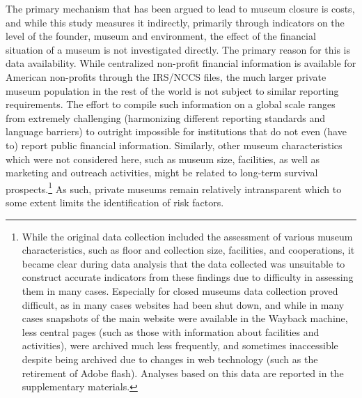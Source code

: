 \documentclass[12pt]{article}
\begin{document}
The primary mechanism that has been argued to lead to museum closure is costs, and while this study measures it indirectly, primarily through indicators on the level of the founder, museum and environment, the effect of the financial situation of a museum is not investigated directly.
The primary reason for this is data availability.
While centralized non-profit financial information is available for American non-profits through the IRS/NCCS files, the much larger private museum population in the rest of the world is not subject to similar reporting requirements.
The effort to compile such information on a global scale ranges from extremely challenging (harmonizing different reporting standards and language barriers) to outright impossible for institutions that do not even (have to) report public financial information.
Similarly, other museum characteristics which were not considered here, such as museum size, facilities, as well as marketing and outreach activities, might be related to long-term survival prospects.\footnote{While the original data collection included the assessment of various museum characteristics, such as floor and collection size, facilities, and cooperations, it became clear during data analysis that the data collected was unsuitable to construct accurate indicators from these findings due to difficulty in assessing them in many cases. Especially for closed museums data collection proved difficult, as in many cases websites had been shut down, and while in many cases snapshots of the main website were available in the Wayback machine, less central pages (such as those with information about facilities and activities), were archived much less frequently, and sometimes inaccessible despite being archived due to changes in web technology (such as the retirement of Adobe flash). Analyses based on this data are reported in the supplementary materials.}
As such, private museums remain relatively intransparent which to some extent limits the identification of risk factors. 
\end{document}
